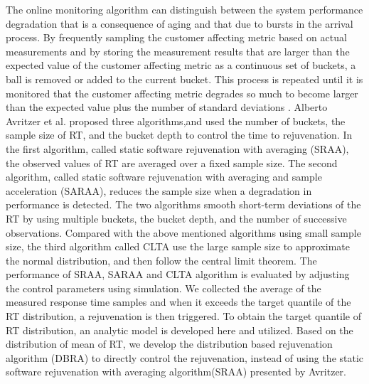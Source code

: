 \documentclass[10pt,journal,letterpaper,compsoc]{IEEEtran}
\begin{document}
The online monitoring algorithm can distinguish between the system performance
degradation that is a consequence of aging and that due to bursts
in the arrival process.
By frequently sampling the customer affecting metric based on actual
measurements and by storing the measurement results that are larger than
the expected value of the customer affecting metric as a continuous set of buckets,
a ball is removed or added to the current bucket.
This process is repeated until it is monitored that the customer affecting metric
degrades so much to become larger than the expected value plus the number of
standard deviations \cite{ChScience:AAvritzer2006DSN}.
Alberto Avritzer et al. proposed three algorithms,and used the number of buckets,
the sample size of RT, and the bucket depth 
to control the time to rejuvenation.
In the first algorithm, called static software rejuvenation with averaging (SRAA), 
the observed values of RT are averaged over a fixed sample size.
The second algorithm, called static software rejuvenation with averaging 
and sample acceleration (SARAA), reduces the sample size when a degradation in 
performance is detected. The two algorithms smooth short-term deviations
of the RT by using multiple buckets, the bucket depth, and the number of 
successive observations. Compared with the above mentioned algorithms using 
small sample size, the third algorithm called CLTA use the large sample size 
to approximate the normal distribution, and then follow the central limit 
theorem. The performance of SRAA, SARAA and CLTA algorithm is evaluated 
by adjusting the control parameters using simulation. 
We collected the average of the measured response time samples and
when it exceeds the target quantile of the RT distribution,
a rejuvenation is then triggered.
To obtain the target quantile of RT distribution,
an analytic model is developed here and utilized.
Based on the distribution of mean of RT, we develop the distribution based
rejuvenation algorithm (DBRA) to directly control the rejuvenation, instead of using the static
software rejuvenation with averaging algorithm(SRAA) 
presented by Avritzer.
\end{document}

